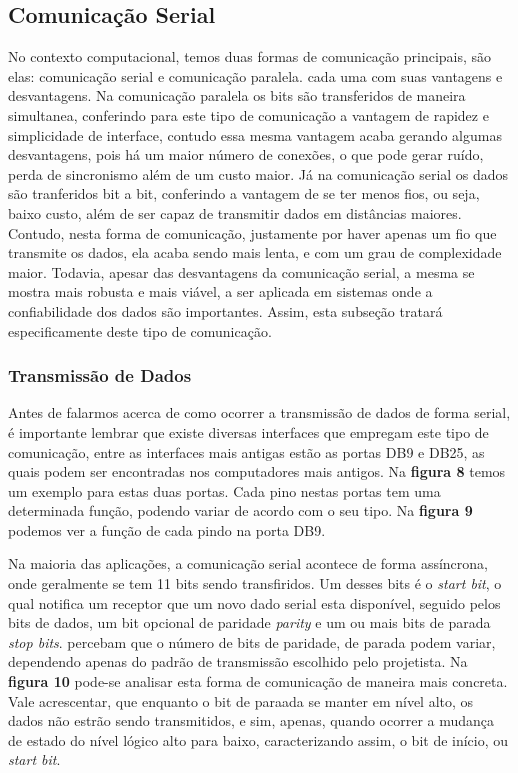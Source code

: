 \documentclass[12pt]{article}
\begin{document}


\subsection{Comunicação Serial}
No contexto computacional, temos duas formas de comunicação principais, são elas: comunicação serial e comunicação paralela. cada uma com suas vantagens e desvantagens. Na comunicação paralela os bits são transferidos de maneira simultanea, conferindo para este tipo de comunicação a vantagem de rapidez e simplicidade de interface, contudo essa mesma vantagem acaba gerando algumas desvantagens, pois há um maior número de conexões, o que pode gerar ruído, perda de sincronismo além de um custo maior. Já na comunicação serial os dados são tranferidos  bit a bit, conferindo a vantagem de se ter menos fios, ou seja, baixo custo, além de ser capaz de transmitir dados em distâncias maiores. Contudo, nesta forma de comunicação, justamente por haver apenas um fio que transmite os dados, ela acaba sendo mais lenta, e com um grau de complexidade maior. Todavia, apesar das desvantagens da comunicação serial, a mesma se mostra mais robusta e mais viável, a ser aplicada em sistemas onde a confiabilidade dos dados são importantes. Assim, esta subseção tratará especificamente deste tipo de comunicação. 

\subsubsection{Transmissão de Dados}
Antes de falarmos acerca de como ocorrer a transmissão de dados de forma serial, é importante lembrar que existe diversas interfaces que empregam este tipo de comunicação, entre as interfaces mais antigas estão as portas DB9 e DB25, as quais podem ser encontradas nos computadores mais antigos. Na \textbf{figura 8} temos um exemplo para estas duas portas. Cada pino nestas portas tem uma determinada função, podendo variar de acordo com o seu tipo. Na  \textbf{figura 9} podemos ver a função de cada pindo na porta DB9.





Na maioria das aplicações, a comunicação serial acontece de forma assíncrona, onde geralmente se tem 11 bits sendo transfiridos. Um desses bits é o \textit{start bit}, o qual notifica um receptor que um novo dado serial esta disponível, seguido pelos bits de dados, um bit opcional de paridade \textit{parity} e um ou mais bits de parada \textit{stop bits}. %
percebam que o número de bits de paridade, de parada podem variar, dependendo apenas do padrão de transmissão escolhido pelo projetista. Na \textbf{figura 10} pode-se analisar esta forma de comunicação de maneira mais concreta. Vale acrescentar, que enquanto o bit de paraada se manter em nível alto, os dados não estrão sendo transmitidos, e sim, apenas, quando ocorrer a mudança de estado do nível lógico alto para baixo, caracterizando assim, o bit de início, ou \textit{start bit}. 
\end{document}
